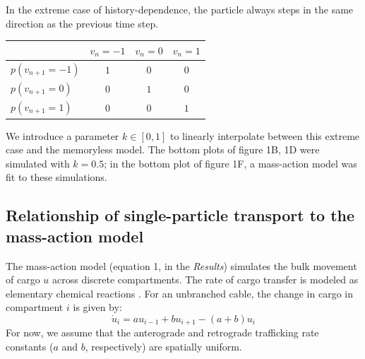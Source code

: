 \documentclass[11pt]{wlpeerj}
\begin{document}
In the extreme case of history-dependence, the particle always steps in the same direction as the previous time step.
\begin{center}
  \begin{tabular}{ l | c  c  c }
    & $v_n=-1$ & $v_n=0$ & $v_n=1$ \\
    \hline
    $p(v_{n+1} = -1)$ & $1$ & $0$ & $0$ \\ 
    $p(v_{n+1} = 0)$  & $0$ & $1$ & $0$ \\ 
    $p(v_{n+1} = 1)$  & $0$ & $0$ & $1$ \\
    \hline
  \end{tabular}
\end{center}
We introduce a parameter $k \in [0,1]$ to linearly interpolate between this extreme case and the memoryless model. The bottom plots of figure 1B, 1D were simulated with $k=0.5$; in the bottom plot of figure 1F, a mass-action model was fit to these simulations.

\subsection*{Relationship of single-particle transport to the mass-action model}

The mass-action model (equation 1, in the \textit{Results}) simulates the bulk movement of cargo $u$ across discrete compartments. The rate of cargo transfer is modeled as elementary chemical reactions \citep{Keener_1998}. For an unbranched cable, the change in cargo in compartment $i$ is given by:
\begin{equation}
\dot{u}_i = a u_{i-1} + b u_{i+1} - (a+b)u_i
\end{equation}
For now, we assume that the anterograde and retrograde trafficking rate constants ($a$ and $b$, respectively) are spatially uniform.
\end{document}

